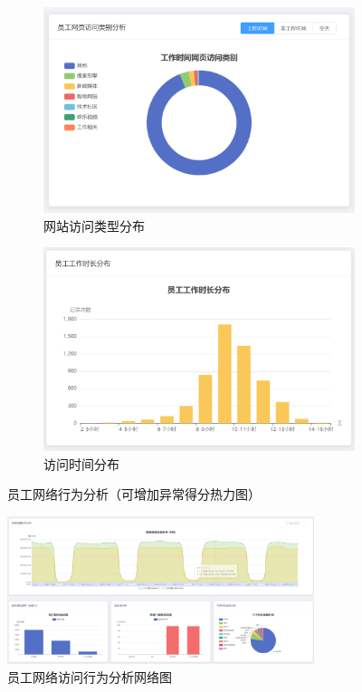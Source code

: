 \documentclass[UTF8,12pt]{ctexart}
\begin{document}
\begin{figure}[H]
    \centering
    \begin{subfigure}{0.48\textwidth}
        \includegraphics[width=\textwidth]{analysis_web.png}
        \caption{网站访问类型分布}
        \label{fig:web_access}
    \end{subfigure}
    \begin{subfigure}{0.48\textwidth}
        \includegraphics[width=\textwidth]{analysis_time.png}
        \caption{访问时间分布}
        \label{fig:time_distribution}
    \end{subfigure}
    \caption{员工网络行为分析（可增加异常得分热力图）}
    \label{fig:network_behavior}
\end{figure}

\begin{figure}[H]
    \centering
    \includegraphics[width=0.8\textwidth]{analysis_network.png}
    \caption{员工网络访问行为分析网络图}
    \label{fig:network_analysis}
\end{figure}
\end{document}
